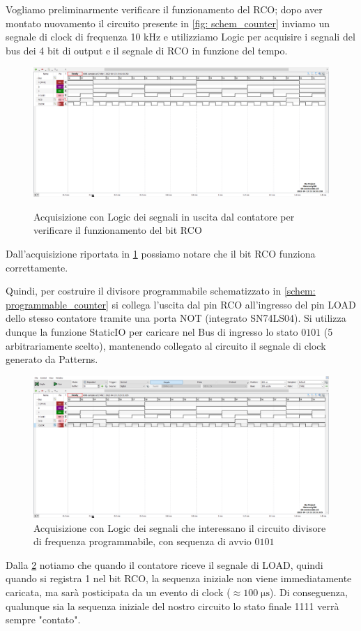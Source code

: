 \documentclass[10pt, a4paper, italian]{article}
\begin{document}
Vogliamo preliminarmente verificare il funzionamento del RCO; dopo aver
montato nuovamento il circuito presente in \cref{fig: schem_counter} inviamo
un segnale di clock di frequenza 10 kHz e utilizziamo Logic per acquisire i
segnali del bus dei 4 bit di output e il segnale di RCO in funzione del tempo.
\begin{figure}[htbp]
\centering
	\includegraphics[width=\textwidth]{5.RCO}
	\label{fig: RCO_f}
	\caption{Acquisizione con Logic dei segnali in uscita dal contatore per
	verificare il funzionamento del bit RCO}
\end{figure}
Dall'acquisizione riportata in \cref{fig: RCO_f} possiamo notare che il bit
RCO funziona correttamente.

Quindi, per costruire il divisore programmabile schematizzato in
\cref{schem: programmable_counter} si collega l'uscita dal pin RCO all'ingresso
del pin LOAD dello stesso contatore tramite una porta NOT (integrato SN74LS04).
Si utilizza dunque la funzione StaticIO per caricare nel Bus di ingresso
lo stato $0101$ (5 arbitrariamente scelto), mantenendo collegato al circuito
il segnale di clock generato da Patterns. 
\begin{figure}[htbp]
\centering
	\includegraphics[width=\textwidth]{5.f_0101}
	\caption{Acquisizione con Logic dei segnali che interessano il circuito
	divisore di frequenza programmabile, con sequenza di avvio $0101$
	\label{fig: c_0101}}
\end{figure}
Dalla \cref{fig: c_0101} notiamo che quando il contatore riceve il
segnale di LOAD, quindi quando si registra 1 nel bit RCO, la sequenza iniziale
non viene immediatamente caricata, ma sarà posticipata da un evento di clock
($\approx 100 \; \si{\micro\s}$).
Di conseguenza, qualunque sia la sequenza iniziale del nostro circuito lo
stato finale 1111 verrà sempre "contato".
\end{document}
